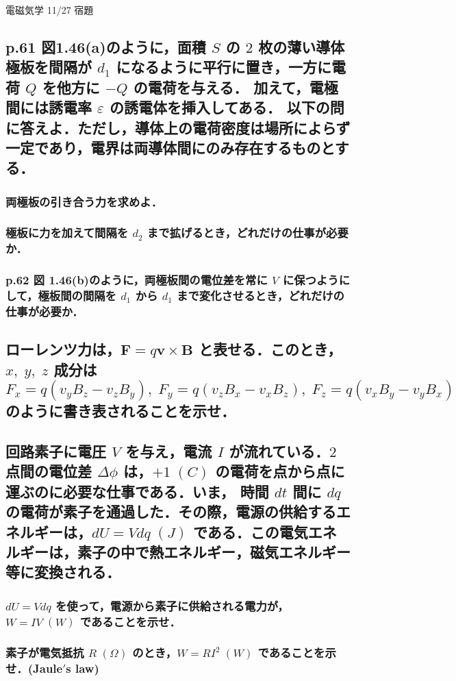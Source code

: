 \documentclass[a4paper, 12pt]{bxjsarticle}
\begin{document}
\begin{center}
    \begin{huge}
        電磁気学 11/27 宿題
    \end{huge}
\end{center}

\begin{samepage}
\subsection{p.61 図1.46(a)のように，面積 \(S\) の \(2\) 枚の薄い導体極板を間隔が \(d_1\) になるように平行に置き，一方に電荷 \(Q\) を他方に \(-Q\) の電荷を与える．%
加えて，電極間には誘電率 \(\varepsilon\) の誘電体を挿入してある．%
以下の問に答えよ．ただし，導体上の電荷密度は場所によらず一定であり，電界は両導体間にのみ存在するものとする．}
\subsubsection{両極板の引き合う力を求めよ．}
\vspace{13em}
\subsubsection{極板に力を加えて間隔を \(d_2\) まで拡げるとき，どれだけの仕事が必要か．}
\vspace{13em}
\subsubsection{p.62 図 1.46(b)のように，両極板間の電位差を常に \(V\) に保つようにして，極板間の間隔を \(d_1\) から \(d_1\) まで変化させるとき，どれだけの仕事が必要か．}
\end{samepage}

\newpage
\subsection{ローレンツ力は，\(\boldsymbol{F}=q\boldsymbol{v}\times\boldsymbol{B}\) と表せる．このとき，\(x,\;y,\;z\) 成分は\[%
    F_x=q(v_yB_z-v_zB_y),\;F_y=q(v_zB_x-v_xB_z),\;F_z=q(v_xB_y-v_yB_x)\]のように書き表されることを示せ．}
\newpage

\subsection{回路素子に電圧 \(V\) を与え，電流 \(I\) が流れている．\(2\) 点間の電位差 \(\Delta \phi\) は，\(+1\;\si{(C)}\) の電荷を点から点に運ぶのに必要な仕事である．いま，%
時間 \(dt\) 間に \(dq\) の電荷が素子を通過した．その際，電源の供給するエネルギーは，\(dU = Vdq\;\si{(J)}\) である．この電気エネルギーは，素子の中で熱エネルギー，磁気エネルギー%
等に変換される．}
\subsubsection{\(dU=Vdq\) を使って，電源から素子に供給される電力が，\(W=IV\;\si{(W)}\) であることを示せ．}
\vspace{20em}
\subsubsection{素子が電気抵抗 \(R\;\si{(\Omega)}\) のとき，\(W=RI^2\;\si{(W)}\) であることを示せ．(Jaule\('\)s law)}
\end{document}
